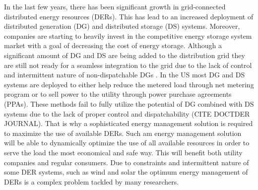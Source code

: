 In the last few years, there has been significant growth in grid-connected distributed energy resources (DERs). This has lead to an increased deployment of distributed generation (DG) and distributed storage (DS) systems. Moreover, companies are starting to heavily invest in the competitive energy storage system market with a goal of decreasing the cost of energy storage. Although a significant amount of DG and DS are being added to the distribution grid they are still not ready for a seamless integration to the grid due to the lack of control and intermittent nature of non-dispatchable DGs \cite{denholm2016path}. In the US most DG and DS systems are deployed to either help reduce the metered load through net metering program or to sell power to the utility through power purchase agreements (PPAs). These methods fail to fully utilize the potential of DG combined with DS systems due to the lack of proper control and dispatchability \colorbox{BurntOrange}{(CITE DOCTDER JOURNAL)}. That is why a sophisticated energy management solution is required to maximize the use of available DERs. Such am energy management solution will be able to dynamically optimize the use of all available resources in order to serve the load the most economical and safe way. This will benefit both utility companies and regular consumers. Due to constraints and intermittent nature of some DER systems, such as wind and solar the optimum energy management of DERs is a complex problem
tackled by many researchers.

